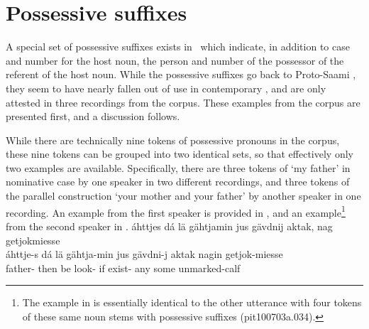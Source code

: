 \section{Possessive suffixes}\label{possSuffixes}
A special set of possessive suffixes exists in \PS\ which indicate, in addition to case and number for the host noun, the person and number of the possessor of the referent of the host noun. 
While the possessive suffixes go back to Proto-Saami \citep[73]{Sammallahti1998}, they seem to have nearly fallen out of use in contemporary \PS, and are only attested in three recordings from the corpus. These examples from the corpus are presented first, and a discussion follows. 

While there are technically nine tokens of possessive pronouns in the corpus, these nine tokens can be grouped into two identical sets, so that effectively only two examples are available. Specifically, there are three tokens of  ‘my father’ in nominative case by one speaker in two different recordings, and three tokens of the parallel construction  ‘your mother and your father’ by another speaker in one recording. An example from the first speaker is provided in , and an example\footnote{The example in  is essentially identical to the other utterance with four tokens of these same noun stems with possessive suffixes (pit100703a.034).} 
from the second speaker in .
\ea\label{possSuffix1}%
\glll	áhttjes dá lä gähtjamin jus gävdnij aktak, nag getjokmiesse\\
	áhttje-s dá lä gähtja-min jus gävdni-j aktak nagin getjok-miesse\\
	father- then be\BS{} look- if exist- any some unmarked-calf\BS{}\\%
	
\z
